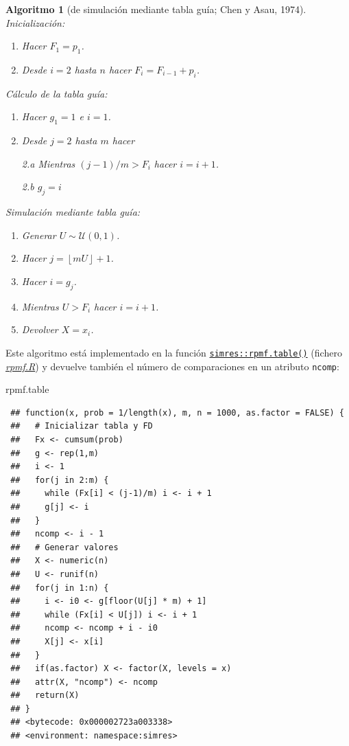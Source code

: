 \documentclass[
  spanish,
  10pt,
]{book}
\newenvironment{Shaded}{\begin{snugshade}}{\end{snugshade}}
\newcommand{\NormalTok}[1]{#1}
\theoremstyle{break}
\newtheorem{conjecture}{Algoritmo}[chapter]
\theoremstyle{nonumberplain}
\begin{document}
\begin{conjecture}[de simulación mediante tabla guía; Chen y Asau, 1974]

Inicialización:

\begin{enumerate}
\def\labelenumi{\arabic{enumi}.}
\item
  Hacer \(F_{1}=p_{1}\).
\item
  Desde \(i=2\) hasta \(n\) hacer \(F_{i}=F_{i-1}+p_{i}\).
\end{enumerate}

Cálculo de la tabla guía:

\begin{enumerate}
\def\labelenumi{\arabic{enumi}.}
\item
  Hacer \(g_{1}=1\) e \(i=1\).
\item
  Desde \(j=2\) hasta \(m\) hacer

  2.a Mientras \((j-1)/m>F_{i}\) hacer \(i=i+1\).

  2.b \(g_{j}=i\)
\end{enumerate}

Simulación mediante tabla guía:

\begin{enumerate}
\def\labelenumi{\arabic{enumi}.}
\item
  Generar \(U\sim \mathcal{U}\left( 0,1\right)\).
\item
  Hacer \(j=\left\lfloor mU\right\rfloor +1\).
\item
  Hacer \(i=g_{j}\).
\item
  Mientras \(U>F_{i}\) hacer \(i=i+1\).
\item
  Devolver \(X=x_{i}\).
\end{enumerate}

\end{conjecture}

Este algoritmo está implementado en la función \href{https://rubenfcasal.github.io/simres/reference/rpmf.table.html}{\texttt{simres::rpmf.table()}} (fichero \href{R/rpmf.R}{\emph{rpmf.R}}) y devuelve también el número de comparaciones en un atributo \texttt{ncomp}:

\begin{Shaded}
\begin{Highlighting}[]
\NormalTok{rpmf.table}
\end{Highlighting}
\end{Shaded}

\begin{verbatim}
 ## function(x, prob = 1/length(x), m, n = 1000, as.factor = FALSE) {
 ##   # Inicializar tabla y FD
 ##   Fx <- cumsum(prob)
 ##   g <- rep(1,m)
 ##   i <- 1
 ##   for(j in 2:m) {
 ##     while (Fx[i] < (j-1)/m) i <- i + 1
 ##     g[j] <- i
 ##   }
 ##   ncomp <- i - 1
 ##   # Generar valores
 ##   X <- numeric(n)
 ##   U <- runif(n)
 ##   for(j in 1:n) {
 ##     i <- i0 <- g[floor(U[j] * m) + 1]
 ##     while (Fx[i] < U[j]) i <- i + 1
 ##     ncomp <- ncomp + i - i0
 ##     X[j] <- x[i]
 ##   }
 ##   if(as.factor) X <- factor(X, levels = x)
 ##   attr(X, "ncomp") <- ncomp
 ##   return(X)
 ## }
 ## <bytecode: 0x000002723a003338>
 ## <environment: namespace:simres>
\end{verbatim}
\end{document}
